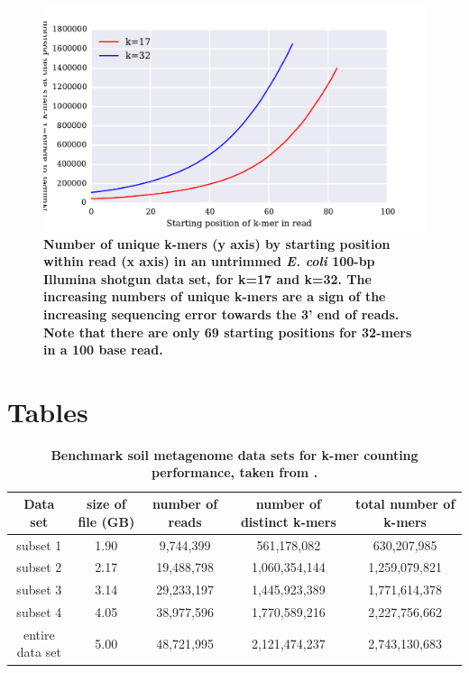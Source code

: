 \documentclass[10pt]{article}
\begin{document}
\begin{figure}[!ht]
\centerline{\includegraphics[width=5in]{./figure/perc_unique_pos}}
\caption{\bf Number of unique k-mers (y axis) by starting position
  within read (x axis) in an untrimmed {\em E. coli} 100-bp Illumina
  shotgun data set, for k=17 and k=32.  The increasing numbers of
  unique k-mers are a sign of the increasing sequencing error towards
  the 3' end of reads.  Note that there are only 69 starting positions
  for 32-mers in a 100 base read.}
\label{fig:perc_unique_pos}
\end{figure}

\clearpage
\section*{Tables}

\begin{table}[!ht]
\caption{
\bf{Benchmark soil metagenome data sets for k-mer counting performance, taken from
\cite{Howe2012}.}}
\begin{tabular}{ |c | c |c| c|c| }
\hline
Data set & size of file (GB) & number of reads & number of distinct
k-mers & total number of k-mers \\
\hline
subset 1        & 1.90 &  9,744,399 &   561,178,082 &   630,207,985 \\
subset 2        & 2.17 & 19,488,798 & 1,060,354,144 & 1,259,079,821 \\
subset 3        & 3.14 & 29,233,197 & 1,445,923,389 & 1,771,614,378 \\
subset 4        & 4.05 & 38,977,596 & 1,770,589,216 & 2,227,756,662 \\
entire data set & 5.00 & 48,721,995 & 2,121,474,237 & 2,743,130,683 \\
\end{tabular}
\begin{flushleft}
\end{flushleft}
\label{table:datasets}
\end{table}
\end{document}
